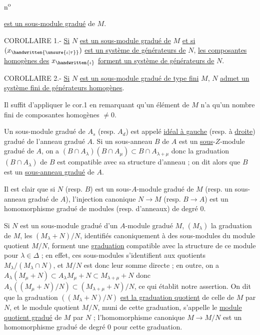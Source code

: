 \begin{flushright}
n\textsuperscript{o}
\end{flushright}

\uline{est un sous-module gradué} de $M$.

COROLLAIRE 1.- \uline{Si} $N$ \uline{est un sous-module gradué de} $M$ \uline{et si} $(x_{\handwritten{\unsure{\iota|\tau}}})$ \uline{est un système de générateurs de} $N$, \uline{les composantes homogènes des} $x_{\handwritten{\iota}}$ \uline{forment un système de générateurs de} $N$.

COROLLAIRE 2.- \uline{Si} $N$ \uline{est un sous-module gradué de type fini} $M$, $N$ \uline{admet un système fini de générateurs homogènes}.

Il suffit d'appliquer le cor.1 en remarquant qu'un élément de $M$ n'a qu'un nombre fini de composantes homogènes $\ne 0$.

Un sous-module gradué de $A_s$ (resp. $A_d$) est appelé \uline{idéal à gauche} (resp. à \uline{droite}) gradué de l'anneau gradué $A$. Si un sous-anneau $B$ de $A$ est un \uline{sous}-$Z$-module gradué de $A$, on a $(B\cap A_\lambda)(B\cap A_\mu)\subset B\cap A_{\lambda+\mu}$ donc la graduation $(B\cap A_\lambda)$ de $B$ est compatible avec sa structure d'anneau ; on dit alors que $B$ est un \uline{sous-anneau gradué} de $A$.

Il est clair que si $N$ (resp. $B$) est un sous-$A$-module gradué de $M$ (resp. un sous-anneau gradué de $A$), l'injection canonique $N\to M$ (resp. $B\to A$) est un homomorphisme gradué de modules (resp. d'anneaux) de degré 0.

Si $N$ est un sous-module gradué d'un $A$-module gradué $M$, $(M_\lambda)$ la graduation de $M$, les $(M_\lambda+N)/N$, identifiés canoniquement à des sous-modules du module quotient $M/N$, forment une \uline{graduation} compatible avec la structure de ce module pour $\lambda\in\Delta$ ; en effet, ces sous-modules s'identifient aux quotients $M_\lambda/(M_\lambda\cap N)$, et $M/N$ est donc leur somme directe ; en outre, on a $A_\lambda(M_\mu+N)\subset A_\lambda M_\mu+N\subset M_{\lambda+\mu}+N$ donc $A_\lambda((M_\mu+N)/N)\subset(M_{\lambda+\mu}+N)/N$, ce qui établit notre assertion. On dit que la graduation $((M_\lambda+N)/N)$ \uline{est la graduation quotient} de celle de $M$ par $N$, et le module quotient $M/N$, muni de cette graduation, s'appelle le \uline{module quotient gradué} de $M$ par $N$ ; l'homomorphisme canonique $M\to M/N$ est un homomorphisme gradué de degré 0 pour cette graduation.

